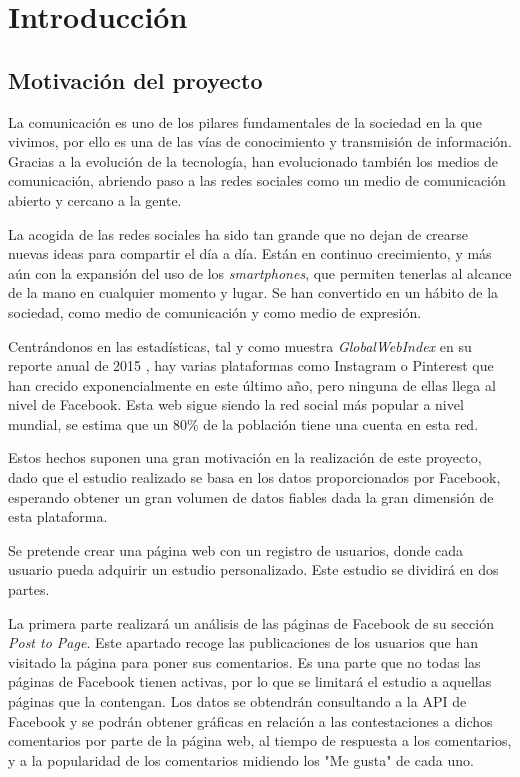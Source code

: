 \chapter{Introducción}

\section{Motivación del proyecto}
La comunicación es uno de los pilares fundamentales de la sociedad en la que vivimos, por ello es una de las vías de conocimiento y transmisión de información. Gracias a la evolución de la tecnología, han evolucionado también los medios de comunicación, abriendo paso a las redes sociales como un medio de comunicación abierto y cercano a la gente.

La acogida de las redes sociales ha sido tan grande que no dejan de crearse nuevas ideas para compartir el día a día. Están en continuo crecimiento, y más aún con la expansión del uso de los \textit{smartphones}, que permiten tenerlas al alcance de la mano en cualquier momento y lugar. Se han convertido en un hábito de la sociedad, como medio de comunicación y como medio de expresión.

Centrándonos en las estadísticas, tal y como muestra \textit{GlobalWebIndex} en su reporte anual de 2015 \cite{2}, hay varias plataformas como Instagram o Pinterest que han crecido exponencialmente en este último año, pero ninguna de ellas  llega al nivel de Facebook. Esta web sigue siendo la red social más popular a nivel mundial, se estima que un 80\% de la población tiene una cuenta en esta red.  
 
Estos hechos suponen una gran motivación en la realización de este proyecto, dado que el estudio realizado se basa en los datos proporcionados por Facebook, esperando obtener un gran volumen de datos fiables dada la gran dimensión de esta plataforma.

Se pretende crear una página web con un registro de usuarios, donde cada usuario pueda adquirir un estudio personalizado. Este estudio se dividirá en dos partes. 

La primera parte realizará un análisis de las páginas de Facebook de su sección \textit{Post to Page}. Este apartado recoge las publicaciones de los usuarios que han visitado la página para poner sus comentarios. Es una parte que no todas las páginas de Facebook tienen activas, por lo que se limitará el estudio a aquellas páginas que la contengan. Los datos se obtendrán consultando a la API de Facebook y se podrán obtener gráficas en relación a las contestaciones a dichos comentarios por parte de la página web, al tiempo de respuesta a los comentarios, y a la popularidad de los comentarios midiendo los "Me gusta" de cada uno.

